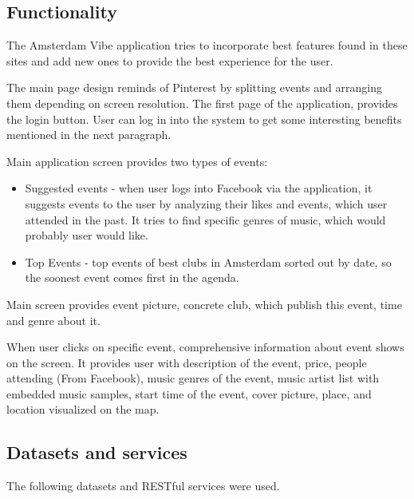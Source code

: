 \documentclass[12pt, a4paper, lithuanian]{article}
\begin{document}
\subsection{Functionality}

  The Amsterdam Vibe application tries to incorporate best features found in these sites and add new ones to provide the best experience for the user.

  The main page design reminds of Pinterest by splitting events and arranging them depending on screen resolution. The first page of the application, provides the login button. User can log in into the system to get some interesting benefits mentioned in the next paragraph.

  Main application screen provides two types of events:

\begin{itemize}

  \item Suggested events - when user logs into Facebook via the application, it suggests events to the user by analyzing their likes and events, which user attended in the past. It tries to find specific genres of music, which would probably user would like.

  \item Top Events - top events of best clubs in Amsterdam sorted out by date, so the soonest event comes first in the agenda.

\end{itemize}

  Main screen provides event picture, concrete club, which publish this event, time and genre about it.

  When user clicks on specific event, comprehensive information about event shows on the screen. It provides user with description of the event, price, people attending (From Facebook), music genres of the event, music artist list with embedded music samples, start time of the event, cover picture, place, and location visualized on the map.

\subsection{Datasets and services}

  The following datasets and RESTful services were used.
\end{document}
